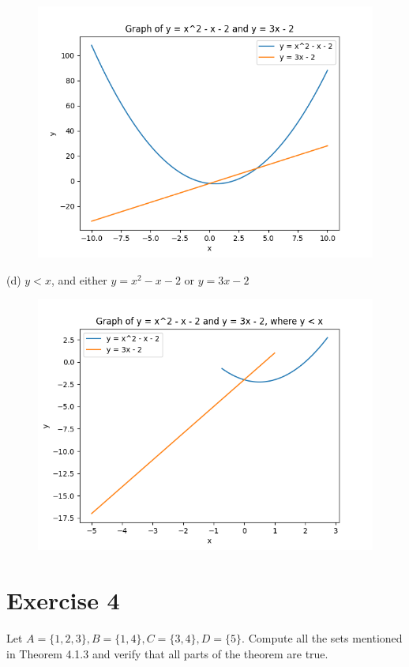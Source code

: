 \documentclass[11pt]{article}
\begin{document}
\begin{figure}[H]
\includegraphics[width=\textwidth]{c.png}
\end{figure}

\noindent (d) $y < x$, and either $y = x^2 - x - 2$ or $y = 3x - 2$

\begin{figure}[H]
\includegraphics[width=\textwidth]{d.png}
\end{figure}

\section*{Exercise 4}

Let $A = \{ 1,2,3 \}, B = \{ 1, 4 \}, C = \{ 3,4 \}, D = \{ 5 \}$. Compute all 
the sets mentioned in Theorem 4.1.3 and verify that all parts of the theorem 
are true.
\end{document}

